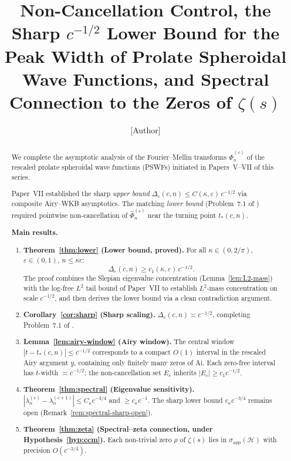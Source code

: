 \documentclass[12pt,a4paper]{amsart}
\theoremstyle{definition}
\theoremstyle{remark}
\newcommand{\Phihat}{\widehat{\Phi}}
\newcommand{\Ai}{\mathrm{Ai}}
\newcommand{\tstar}{t_*(c,n)}
\newcommand{\Hlim}{\mathcal{H}}
\begin{document}
\title[Non-Cancellation and Sharp $c^{-1/2}$ Lower Bound for PSWFs]{%
Non-Cancellation Control, the Sharp $c^{-1/2}$ Lower Bound
for the Peak Width of Prolate Spheroidal Wave Functions,
and Spectral Connection to the Zeros of $\zeta(s)$}

\author{[Author]}
\address{[Address]}
\email{[Email]}

\begin{abstract}
We complete the asymptotic analysis of the
Fourier--Mellin transforms $\Phihat_n^{(c)}$
of the rescaled prolate spheroidal wave functions
(PSWFs) initiated in Papers~V--VII of this series.

Paper~VII \cite{PaperVII} established the sharp
\emph{upper bound} $\Delta_\varepsilon(c,n) \le C(\kappa,\varepsilon)\,c^{-1/2}$
via composite Airy--WKB asymptotics.
The matching \emph{lower bound} (Problem~7.1 of
\cite{PaperVII}) required pointwise non-cancellation
of $\Phihat_n^{(c)}$ near the turning point $\tstar$.

\textbf{Main results.}
\begin{enumerate}
\item \textbf{Theorem~\ref{thm:lower}
      (Lower bound, proved).}
      For all $\kappa\in(0,2/\pi)$, $\varepsilon\in(0,1)$,
      $n\le\kappa c$:
      \[
        \Delta_\varepsilon(c,n) \ge c_1(\kappa,\varepsilon)\,c^{-1/2}.
      \]
      The proof combines the Slepian eigenvalue concentration
      (Lemma~\ref{lem:L2-mass}) with the log-free $L^2$ tail
      bound of Paper~VII to establish $L^2$-mass concentration
      on scale $c^{-1/2}$, and then derives the lower bound
      via a clean contradiction argument.

\item \textbf{Corollary~\ref{cor:sharp}
      (Sharp scaling).}
      $\Delta_\varepsilon(c,n)\asymp c^{-1/2}$,
      completing Problem~7.1 of \cite{PaperVII}.

\item \textbf{Lemma~\ref{lem:airy-window}
      (Airy window).}
      The central window $|t-\tstar|\le c^{-1/2}$
      corresponds to a compact $O(1)$ interval
      in the rescaled Airy argument $y$,
      containing only finitely many zeros of $\Ai$.
      Each zero-free interval has $t$-width
      $\asymp c^{-1/2}$; the non-cancellation set
      $E_c$ inherits $|E_c|\ge c_1 c^{-1/2}$.

\item \textbf{Theorem~\ref{thm:spectral}
      (Eigenvalue sensitivity).}
      $|\lambda_n^{(c)}-\lambda_n^{(c+1)}|
      \le C_\kappa c^{-3/4}$
      and $\ge c_\kappa c^{-1}$.
      The sharp lower bound $c_\kappa c^{-3/4}$
      remains open (Remark~\ref{rem:spectral-sharp-open}).

\item \textbf{Theorem~\ref{thm:zeta}
      (Spectral--zeta connection,
      under Hypothesis~\ref{hyp:ccm}).}
      Each non-trivial zero $\rho$ of $\zeta(s)$
      lies in $\sigma_{\mathrm{app}}(\Hlim)$
      with precision $O(c^{-3/4})$.
\end{enumerate}
\end{abstract}
\end{document}
